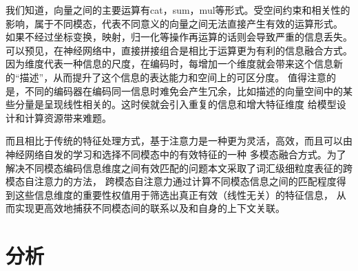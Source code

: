 我们知道，向量之间的主要运算有cat，sum，mul等形式。受空间约束和相关性的影响，属于不同模态，代表不同意义的向量之间无法直接产生有效的运算形式。
如果不经过坐标变换，映射，归一化等操作再运算的话则会导致严重的信息丢失。可以预见，在神经网络中，直接拼接组合是相比于运算更为有利的信息融合方式。
因为维度代表一种信息的尺度，在编码时，每增加一个维度就会带来这个信息新的“描述”，从而提升了这个信息的表达能力和空间上的可区分度。
值得注意的是，不同的编码器在编码同一信息时难免会产生冗余，比如描述的向量空间中的某些分量是呈现线性相关的。这时侯就会引入重复的信息和增大特征维度
给模型设计和计算资源带来难题。

而且相比于传统的特征处理方式，基于注意力是一种更为灵活，高效，而且可以由神经网络自发的学习和选择不同模态中的有效特征的一种
多模态融合方式。为了解决不同模态编码信息维度之间有效匹配的问题本文采取了词汇级细粒度表征的跨模态自注意力的方法，
跨模态自注意力通过计算不同模态信息之间的匹配程度得到这些信息维度的重要性权值用于筛选出真正有效（线性无关）的特征信息，
从而实现更高效地捕获不同模态间的联系以及和自身的上下文关联。

\section{分析}
